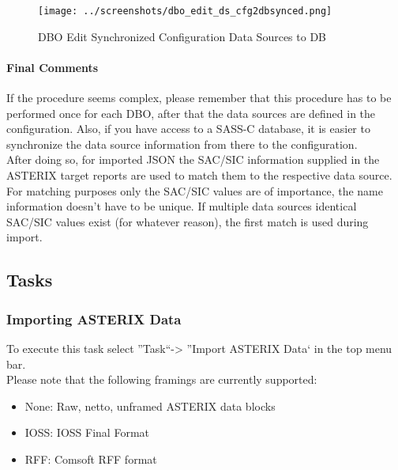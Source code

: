 {\begin{figure}[H]
  \hspace*{-2cm}
    \texttt{[image: ../screenshots/dbo\_edit\_ds\_cfg2dbsynced.png]}
  \caption{DBO Edit Synchronized Configuration Data Sources to DB}
  \label{fig:dbo_edit_ds_cfg2dbsynced}
\end{figure}


\paragraph{Final Comments}

If the procedure seems complex, please remember that this procedure  has to be performed once for each DBO, after that the data sources are defined in the configuration. Also, if you have access to a SASS-C database, it is easier to synchronize the data source information from there to the configuration. \\

After doing so, for imported JSON the SAC/SIC information supplied in the ASTERIX target reports are used to match them to the respective data source. \\

For matching purposes only the SAC/SIC values are of importance, the name information doesn't have to be unique. If multiple data sources identical SAC/SIC values exist (for whatever reason), the first match is used during import.

\subsection{Tasks}
\label{sec:tasks}

\subsubsection{Importing ASTERIX Data}
\label{sec:asterix_import}

To execute this task select ''Task``->  ''Import ASTERIX Data` in the top menu bar. \\

Please note that the following framings are currently supported:
\begin{itemize}  
\item None: Raw, netto, unframed ASTERIX data blocks
\item IOSS: IOSS Final Format
\item RFF: Comsoft RFF format
\end{itemize}

}
